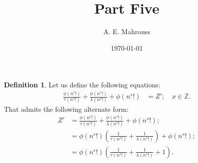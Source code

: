 \documentclass[10pt]{article}
\title{%
  \vspace{-1.5em}%
  \large\textbf{Part Five}%
}
\author{A. E. Mahrouss}
\date{\today}
\theoremstyle{plain}
\theoremstyle{definition}
\newtheorem{definition}[theorem]{Definition}
\theoremstyle{remark}
\begin{document}
\begin{definition}
	Let us define the following equations:
	\begin{align*}
		\frac{\phi(n^{s}!)}{\tau(n^{s}!)} + \frac{\phi(n^{s}!)}{\lambda(n^{s}!)} + \phi(n^{s}!) &= Z'; \quad x \in \mathbb{Z}.
	\end{align*}
	That admits the following alternate form:
	\begin{align*}
		Z' &= \frac{\phi(n^{s}!)}{\tau(n^{s}!)} + \frac{\phi(n^{s}!)}{\lambda(n^{s}!)} + \phi(n^{s}!);\\
		&= \phi(n^{s}!)(\frac{1}{\tau(n^{s}!)} + \frac{1}{\lambda(n^{s}!)}) + \phi(n^{s}!);\\
		&= \phi(n^{s}!)(\frac{1}{\tau(n^{s}!)} + \frac{1}{\lambda(n^{s}!)} + 1).
	\end{align*}
\end{definition}

\nocite{*}


\end{document}
